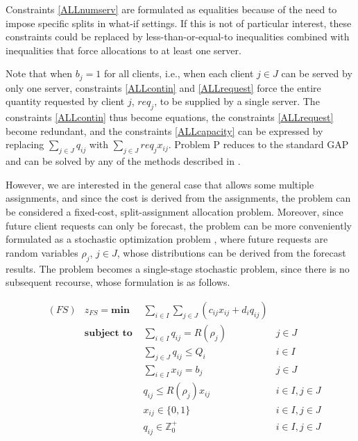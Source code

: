 \documentclass[preprint,11pt,authoryear]{elsarticle}
\begin{document}
Constraints \ref{ALLnumserv} are formulated as equalities because of the need to impose specific splits in what-if settings. If this is not of particular interest, these constraints could be replaced by less-than-or-equal-to inequalities combined with inequalities that force allocations to at least one server.

Note that when $b_j = 1$ for all clients, i.e., when each client $j \in J$ can be served by only one server, constraints \ref{ALLcontin} and \ref{ALLrequest} force the entire quantity requested by client $j$, $req_j$, to be supplied by a single server. The constraints \ref{ALLcontin} thus become equations, the constraints \ref{ALLrequest} become redundant, and the constraints \ref{ALLcapacity} can be expressed by replacing $\sum_{j \in J}q_{ij}$ with $\sum_{j \in J}req_j x_{ij}$. Problem P reduces to the standard GAP and can be solved by any of the methods described in \citet{matheuristics}.

However, we are interested in the general case that allows some multiple assignments, and since the cost is derived from the assignments, the problem can be considered a fixed-cost, split-assignment allocation problem.
Moreover, since future client requests can only be forecast, the problem can be more conveniently formulated as a stochastic optimization problem \citep{KM10,BL11}, where future requests are random variables $\rho_j$, $j \in J$, whose distributions can be derived from the forecast results. The problem becomes a single-stage stochastic problem, since there is no subsequent recourse, whose formulation is as follows.

\begin{align}
	&(FS) & z_{FS} = \textbf{min } & \sum_{i \in I} \sum_{j \in J} ( c_{ij}x_{ij} + d_i q_{ij} ) \label{SALLobj}\\
	& &  \textbf{subject to }
	& \sum_{i \in I} q_{ij} = R(\rho_j) & j \in J  \label{SALLrequest}\\
	& &  & \sum_{j \in J}q_{ij} \leq Q_i & i \in I \label{SALLcapacity}\\
	& &  & \sum_{i \in I} x_{ij} = b_j & j \in J  \label{SALLnumserv}\\
	& &  & q_{ij} \leq R(\rho_j) x_{ij} & i \in I, j \in J \label{SALLcontin}\\
	& &  & x_{ij} \in \{0,1\} & i\in I, j \in J \label{SALLx}\\
	& &  & q_{ij} \in \mathbb{Z}^+_0 & i\in I, j \in J \label{SALLq}
\end{align}
\end{document}
